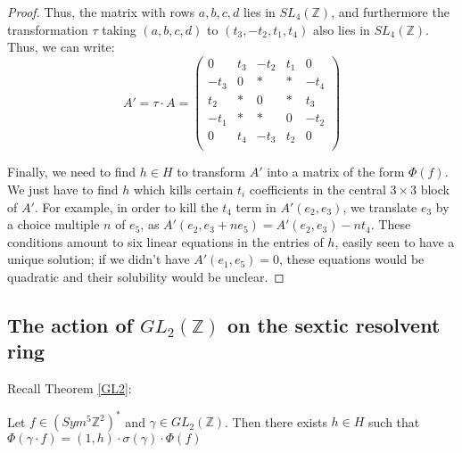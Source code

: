 \documentclass{article}
\begin{document}
\begin{proof}
Thus, the matrix with rows $a,b,c,d$ lies in $SL_4(\mathbb{Z})$, and furthermore the transformation $\tau$ taking $(a,b,c,d)$ to $(t_3, - t_2, t_1, t_4)$ also lies in $SL_4(\mathbb{Z})$.  Thus, we can write:
\begin{equation} A' = \tau \cdot A = 
\begin{pmatrix}
0 & t_3 & - t_2 & t_1 & 0 \\
- t_3 & 0 & * & * & - t_4 \\
t_2 & * & 0 & * & t_3 \\
- t_1 & * & * & 0 & - t_2 \\
0 & t_4 & - t_3 & t_2 & 0 \\
\end{pmatrix}
\end{equation}

Finally, we need to find $h \in H$ to transform $A'$ into a matrix of the form $\Phi(f)$.  We just have to find $h$ which kills certain $t_i$ coefficients in the central $3 \times 3$ block of $A'$.  For example, in order to kill the $t_4$ term in $A'(e_2, e_3)$, we translate $e_3$ by a choice multiple $n$ of $e_5$, as $A'(e_2, e_3 + n e_5) = A'(e_2, e_3) - n t_4$.  These conditions amount to six linear equations in the entries of $h$, easily seen to have a unique solution; if we didn't have $A'(e_1,e_5) = 0$, these equations would be quadratic and their solubility would be unclear.
\end{proof}

\subsection{The action of $GL_2(\mathbb{Z})$ on the sextic resolvent ring}

Recall Theorem \ref{GL2}:

\begin{theorem} \nonumber
Let $f \in (Sym^5 \mathbb{Z}^2)^*$ and $\gamma \in GL_2(\mathbb{Z})$.  Then there exists $h \in H$ such that $\Phi( \gamma \cdot f) = (1,h) \cdot \sigma ( \gamma ) \cdot \Phi(f)$
\end{theorem}
\end{document}
